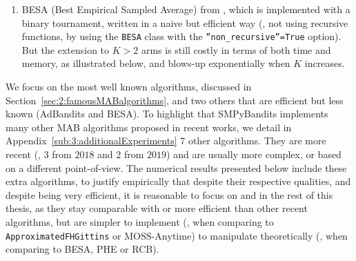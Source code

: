 \begin{enumerate}
    \item
    BESA (Best Empirical Sampled Average) from \cite{Baransi2014},
    which is implemented with a binary tournament, written in a naive but efficient way
    (\ie, not using recursive functions, by using the \texttt{BESA} class with the \texttt{''non\_recursive''=True} option).
    But the extension to $K>2$ arms is still costly in terms of both time and memory, as illustrated below, and blows-up exponentially  when $K$ increases.
\end{enumerate}

We focus on the most well known algorithms, discussed in Section~\ref{sec:2:famousMABalgorithms}, and two others that are efficient but less known (AdBandits and BESA).
To highlight that SMPyBandits implements many other MAB algorithms proposed in recent works, we detail in Appendix~\ref{sub:3:additionalExperiments} $7$ other algorithms.
They are more recent (\eg, $3$ from $2018$ and $2$ from $2019$) and are usually more complex, or based on a different point-of-view.
The numerical results presented below include these extra algorithms, to justify empirically that despite their respective qualities, and despite being very efficient, it is reasonable to focus on \UCB{} and \klUCB{} in the rest of this thesis, as they stay comparable with or more efficient than other recent algorithms, but are simpler to implement (\eg, when comparing \UCB{} to \texttt{ApproximatedFHGittins} or $\mathrm{MOSS}$-$\mathrm{Anytime}$) to manipulate theoretically (\eg, when comparing \klUCB{} to BESA, PHE or RCB).


